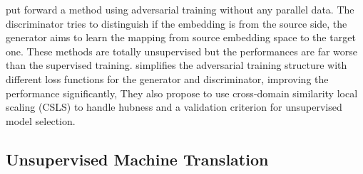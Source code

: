 \cite{zhang2017adversarial} put forward  a method using adversarial training without any parallel data. The discriminator tries to distinguish if the embedding is from the source side, the generator aims to learn the mapping from source embedding space to the target one. These methods are totally unsupervised but the performances are far worse than the supervised training. \cite{conneau2017word} simplifies the adversarial training structure with different loss functions for the generator and discriminator, improving the performance significantly, They also propose to use cross-domain similarity local scaling (CSLS) to handle hubness and a validation criterion for unsupervised model selection.


\subsection{Unsupervised Machine Translation}

